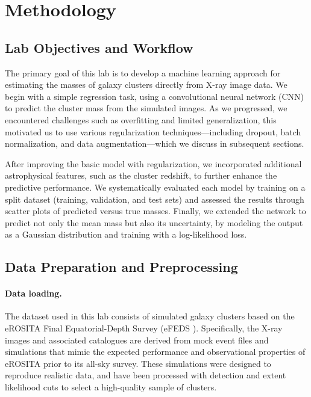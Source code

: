 \section{Methodology} \label{sec:methodology}


\subsection{Lab Objectives and Workflow}

The primary goal of this lab is to develop a machine 
learning approach for estimating the masses of galaxy 
clusters directly from X-ray image data. We begin with a 
simple regression task, using a convolutional neural network
(CNN) to predict the cluster mass from the simulated images. 
As we progressed, we encountered challenges such as overfitting 
and limited generalization, this motivated us to use various 
regularization techniques—including dropout, batch normalization,
and data augmentation—which we discuss in subsequent sections.

After improving the basic model with regularization, we 
incorporated additional astrophysical features, such as the 
cluster redshift, to further enhance the predictive performance. 
We systematically evaluated each model by training on a split 
dataset (training, validation, and test sets) and assessed the
results through scatter plots of predicted versus true masses. 
Finally, we extended the network to predict not only the mean 
mass but also its uncertainty, by modeling the output as a 
Gaussian distribution and training with a log-likelihood loss. 




\subsection{Data Preparation and Preprocessing}

\paragraph{Data loading.}


The dataset used in this lab consists of simulated galaxy 
clusters based on the eROSITA Final Equatorial-Depth Survey (eFEDS \cite{eFEDS_V3}). 
Specifically, 
the X-ray images and associated catalogues are derived from mock
event files and simulations that mimic the expected performance 
and observational properties of eROSITA prior to its all-sky survey. 
These simulations were designed to reproduce realistic data,
and have been processed with detection and extent 
likelihood cuts to select a high-quality sample of clusters.

